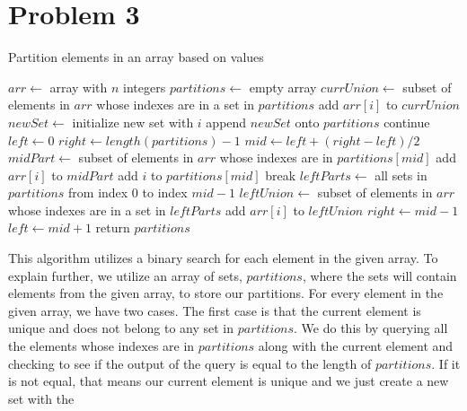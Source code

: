 \documentclass[12pt]{article}
\begin{document}
\section*{Problem 3}
\begin{algorithm}
\caption{Partition elements in an array based on values}
\begin{algorithmic}[1]
\State $arr \gets $ array with $n$ integers
\State $partitions \gets $ empty array
    \State $currUnion \gets$ subset of elements in $arr$ whose indexes are in a set in $partitions$
    \State add $arr[i]$ to $currUnion$
        \State $newSet \gets $ initialize new set with $i$
        \State append $newSet$ onto $partitions$
        \State continue
    \EndIf
    \State
    \State $left \gets 0$
    \State $right \gets length(partitions) - 1$
        \State $mid \gets left + (right - left) / 2$
        \State
        \State $midPart \gets $ subset of elements in $arr$ whose indexes are in $partitions[mid]$
        \State add $arr[i]$ to $midPart$ 
            \State add $i$ to $partitions[mid]$
            \State break
        \EndIf
        \State
        \State $leftParts \gets $ all sets in $partitions$ from index 0 to index $mid - 1$
        \State $leftUnion \gets $ subset of elements in $arr$ whose indexes are in a set in $leftParts$
        \State add $arr[i]$ to $leftUnion$
            \State $right \gets mid - 1$
        \Else
            \State $left \gets mid + 1$
        \EndIf 
    \EndWhile
\EndFor
\State return $partitions$
\end{algorithmic}
\end{algorithm}
\noindent
This algorithm utilizes a binary search for each element in the given array. To explain further,
we utilize an array of sets, $partitions$, where the sets will contain elements from the given array, to store 
our partitions. 
\newline
\newline
For every element in the given array, we have two cases. The first case is that the current
element is unique and does not belong to any set in $partitions$. We do this by querying all the elements whose indexes are in 
$partitions$ along with the current element and checking to see if the output of the query is equal to the length
of $partitions$. If it is not equal, that means our current element is unique and we just create a new set with the 
\end{document}

